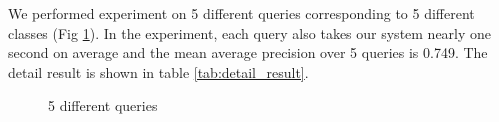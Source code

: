 We performed experiment on 5 different queries corresponding to 5 different classes (Fig \ref{fig:queries}). In the experiment, each query also takes our system nearly one second on average and the mean average precision over 5 queries is 0.749. The detail result is shown in table \ref{tab:detail_result}.

\begin{figure}
    \begin{minipage}{1\textwidth}
        \centering
    \end{minipage}
    \vfill
    \begin{minipage}{1\textwidth}
        \centering
    \end{minipage}
    \vfill
    \begin{minipage}{1\textwidth}
        \centering
    \end{minipage}
    \caption{5 different queries}
    \label{fig:queries}
\end{figure}

